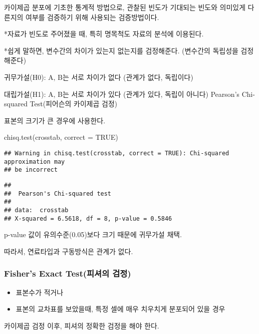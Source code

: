 \documentclass[
]{article}
\newenvironment{Shaded}{\begin{snugshade}}{\end{snugshade}}
\newcommand{\AttributeTok}[1]{\textcolor[rgb]{0.77,0.63,0.00}{#1}}
\newcommand{\ConstantTok}[1]{\textcolor[rgb]{0.00,0.00,0.00}{#1}}
\newcommand{\FunctionTok}[1]{\textcolor[rgb]{0.00,0.00,0.00}{#1}}
\newcommand{\NormalTok}[1]{#1}
\providecommand{\tightlist}{%
  \setlength{\itemsep}{0pt}\setlength{\parskip}{0pt}}
\begin{document}
카이제곱 분포에 기초한 통계적 방법으로, 관찰된 빈도가 기대되는 빈도와 의미있게 다른지의 여부를 검증하기 위해 사용되는 검증방법이다.

*자료가 빈도로 주어졌을 때, 특히 명목척도 자료의 분석에 이용된다.

*쉽게 말하면, 변수간의 차이가 있는지 없는지를 검정해준다. (변수간의 독립성을 검정해준다)

귀무가설(H0): A, B는 서로 차이가 없다 (관계가 없다, 독립이다)

대립가설(H1): A, B는 서로 차이가 있다 (관계가 있다, 독립이 아니다)
Pearson's Chi-squared Test(피어슨의 카이제곱 검정)

표본의 크기가 큰 경우에 사용한다.

\begin{Shaded}
\begin{Highlighting}[]
\FunctionTok{chisq.test}\NormalTok{(crosstab, }\AttributeTok{correct =} \ConstantTok{TRUE}\NormalTok{)}
\end{Highlighting}
\end{Shaded}

\begin{verbatim}
## Warning in chisq.test(crosstab, correct = TRUE): Chi-squared approximation may
## be incorrect
\end{verbatim}

\begin{verbatim}
## 
##  Pearson's Chi-squared test
## 
## data:  crosstab
## X-squared = 6.5618, df = 8, p-value = 0.5846
\end{verbatim}

p-value 값이 유의수준(0.05)보다 크기 때문에 귀무가설 채택.

따라서, 연료타입과 구동방식은 관계가 없다.

\hypertarget{fishers-exact-testuxd53cuxc154uxc758-uxac80uxc815}{%
\subsubsection{Fisher's Exact Test(피셔의 검정)}\label{fishers-exact-testuxd53cuxc154uxc758-uxac80uxc815}}

\begin{itemize}
\tightlist
\item
  표본수가 적거나
\item
  표본의 교차표를 보았을때, 특정 셀에 매우 치우치게 분포되어 있을 경우
\end{itemize}

카이제곱 검정 이후, 피셔의 정확한 검정을 해야 한다.
\end{document}
